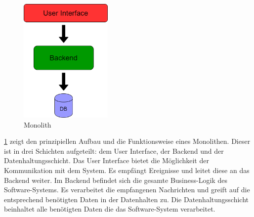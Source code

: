 \begin{figure}[bth]
    \centering
    \includegraphics[width=0.4\textwidth]{Chapters/Bilder/Monolith.png}
    \caption{Monolith}
   \label{fig:monolith}
  \end{figure}
  
\ref{fig:monolith} zeigt den prinzipiellen Aufbau und die Funktionsweise eines Monolithen.
Dieser ist in drei Schichten aufgeteilt: dem User Interface, der Backend und der Datenhaltungsschicht.
Das User Interface bietet die Möglichkeit der Kommunikation mit dem System. Es empfängt Ereignisse und leitet diese an das Backend weiter.
Im Backend befindet sich die gesamte Business-Logik des Software-Systems. Es verarbeitet die empfangenen Nachrichten und greift auf die entsprechend benötigten Daten in der Datenhalten zu.
Die Datenhaltungsschicht beinhaltet alle benötigten Daten die das Software-System verarbeitet.\newline\newline

